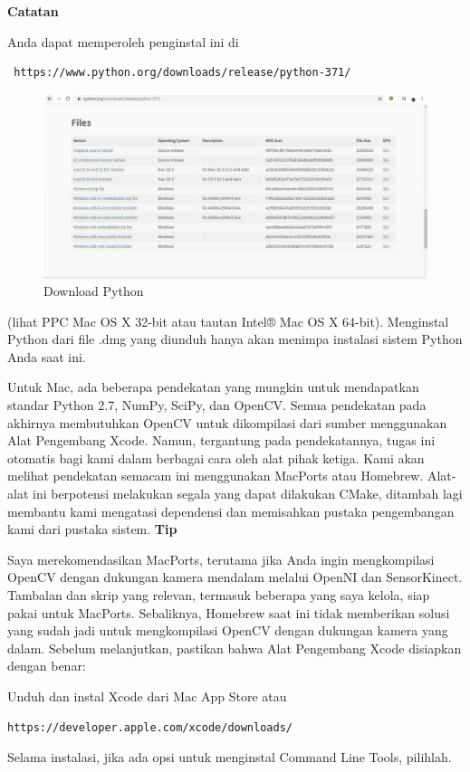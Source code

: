 \textbf{Catatan}

Anda dapat memperoleh penginstal ini di \begin{verbatim} https://www.python.org/downloads/release/python-371/ \end{verbatim} 
		\begin{figure}[ht]
		\centering
		\includegraphics[scale=0.3]{figures/1,10.jpg}
		\caption{Download Python}
		\label{contoh}
		\end{figure}
(lihat PPC Mac OS X 32-bit atau tautan Intel® Mac OS X 64-bit). Menginstal Python dari file .dmg yang diunduh hanya akan menimpa instalasi sistem Python Anda saat ini.

Untuk Mac, ada beberapa pendekatan yang mungkin untuk mendapatkan standar Python 2.7, NumPy, SciPy, dan OpenCV. Semua pendekatan pada akhirnya membutuhkan OpenCV untuk dikompilasi dari sumber menggunakan Alat Pengembang Xcode. Namun, tergantung pada pendekatannya, tugas ini otomatis bagi kami dalam berbagai cara oleh alat pihak ketiga. Kami akan melihat pendekatan semacam ini menggunakan MacPorts atau Homebrew. Alat-alat ini berpotensi melakukan segala yang dapat dilakukan CMake, ditambah lagi membantu kami mengatasi dependensi dan memisahkan pustaka pengembangan kami dari pustaka sistem.
\newpage
\textbf{Tip}

Saya merekomendasikan MacPorts, terutama jika Anda ingin mengkompilasi OpenCV dengan dukungan kamera mendalam melalui OpenNI dan SensorKinect. Tambalan dan skrip yang relevan, termasuk beberapa yang saya kelola, siap pakai untuk MacPorts. Sebaliknya, Homebrew saat ini tidak memberikan solusi yang sudah jadi untuk mengkompilasi OpenCV dengan dukungan kamera yang dalam. Sebelum melanjutkan, pastikan bahwa Alat Pengembang Xcode disiapkan dengan benar:

Unduh dan instal Xcode dari Mac App Store atau \begin{verbatim}https://developer.apple.com/xcode/downloads/ \end{verbatim} Selama instalasi, jika ada opsi untuk menginstal Command Line Tools, pilihlah.

